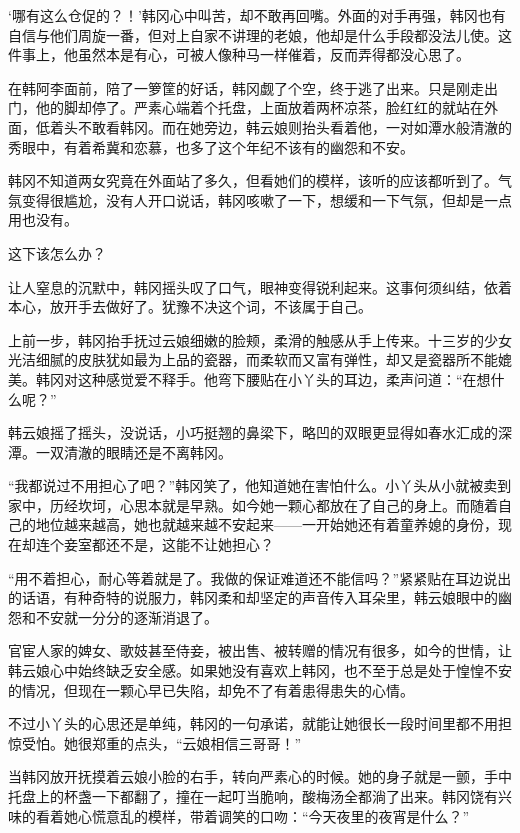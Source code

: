 ‘哪有这么仓促的？！’韩冈心中叫苦，却不敢再回嘴。外面的对手再强，韩冈也有自信与他们周旋一番，但对上自家不讲理的老娘，他却是什么手段都没法儿使。这件事上，他虽然本是有心，可被人像种马一样催着，反而弄得都没心思了。

在韩阿李面前，陪了一箩筐的好话，韩冈觑了个空，终于逃了出来。只是刚走出门，他的脚却停了。严素心端着个托盘，上面放着两杯凉茶，脸红红的就站在外面，低着头不敢看韩冈。而在她旁边，韩云娘则抬头看着他，一对如潭水般清澈的秀眼中，有着希冀和恋慕，也多了这个年纪不该有的幽怨和不安。

韩冈不知道两女究竟在外面站了多久，但看她们的模样，该听的应该都听到了。气氛变得很尴尬，没有人开口说话，韩冈咳嗽了一下，想缓和一下气氛，但却是一点用也没有。

这下该怎么办？

让人窒息的沉默中，韩冈摇头叹了口气，眼神变得锐利起来。这事何须纠结，依着本心，放开手去做好了。犹豫不决这个词，不该属于自己。

上前一步，韩冈抬手抚过云娘细嫩的脸颊，柔滑的触感从手上传来。十三岁的少女光洁细腻的皮肤犹如最为上品的瓷器，而柔软而又富有弹性，却又是瓷器所不能媲美。韩冈对这种感觉爱不释手。他弯下腰贴在小丫头的耳边，柔声问道：“在想什么呢？”

韩云娘摇了摇头，没说话，小巧挺翘的鼻梁下，略凹的双眼更显得如春水汇成的深潭。一双清澈的眼睛还是不离韩冈。

“我都说过不用担心了吧？”韩冈笑了，他知道她在害怕什么。小丫头从小就被卖到家中，历经坎坷，心思本就是早熟。如今她一颗心都放在了自己的身上。而随着自己的地位越来越高，她也就越来越不安起来——一开始她还有着童养媳的身份，现在却连个妾室都还不是，这能不让她担心？

“用不着担心，耐心等着就是了。我做的保证难道还不能信吗？”紧紧贴在耳边说出的话语，有种奇特的说服力，韩冈柔和却坚定的声音传入耳朵里，韩云娘眼中的幽怨和不安就一分分的逐渐消退了。

官宦人家的婢女、歌妓甚至侍妾，被出售、被转赠的情况有很多，如今的世情，让韩云娘心中始终缺乏安全感。如果她没有喜欢上韩冈，也不至于总是处于惶惶不安的情况，但现在一颗心早已失陷，却免不了有着患得患失的心情。

不过小丫头的心思还是单纯，韩冈的一句承诺，就能让她很长一段时间里都不用担惊受怕。她很郑重的点头，“云娘相信三哥哥！”

当韩冈放开抚摸着云娘小脸的右手，转向严素心的时候。她的身子就是一颤，手中托盘上的杯盏一下都翻了，撞在一起叮当脆响，酸梅汤全都淌了出来。韩冈饶有兴味的看着她心慌意乱的模样，带着调笑的口吻：“今天夜里的夜宵是什么？”

